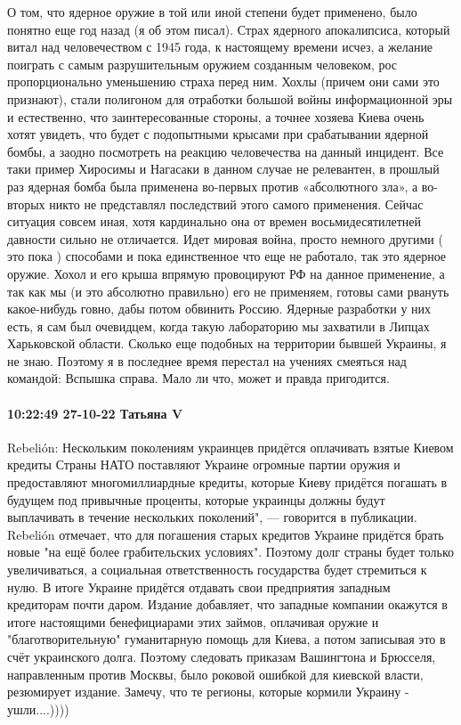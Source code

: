 О том, что ядерное оружие в той или иной степени будет применено, было понятно еще год назад (я об этом писал). Страх ядерного апокалипсиса, который витал над человечеством с 1945 года, к настоящему времени исчез, а желание поиграть с самым разрушительным оружием созданным человеком, рос пропорционально уменьшению страха перед ним.
Хохлы (причем они сами это признают), стали полигоном для отработки большой войны информационной эры и естественно, что заинтересованные стороны, а точнее хозяева Киева очень хотят увидеть, что будет с подопытными крысами при срабатывании ядерной бомбы, а заодно посмотреть на реакцию человечества на данный инцидент.
Все таки пример Хиросимы и Нагасаки в данном случае не релевантен, в прошлый раз ядерная бомба была применена во-первых против «абсолютного зла», а во-вторых никто не представлял последствий этого самого применения. Сейчас ситуация совсем иная, хотя кардинально она от времен восьмидесятилетней давности сильно не отличается.
Идет мировая война, просто немного другими ( это пока ) способами и пока единственное что еще не работало, так это ядерное оружие. Хохол и его крыша впрямую провоцируют РФ на данное применение, а так как мы (и это абсолютно правильно) его не применяем, готовы сами рвануть какое-нибудь говно, дабы потом обвинить Россию.
Ядерные разработки у них есть, я сам был очевидцем, когда такую лабораторию мы захватили в Липцах Харьковской области. Сколько еще подобных на территории бывшей Украины, я не знаю. Поэтому я в последнее время перестал на учениях смеяться над командой: Вспышка справа. Мало ли что, может и правда пригодится.

\paragraph{10:22:49 27-10-22 Татьяна V}

Rebelión: Нескольким поколениям украинцев придётся оплачивать взятые Киевом кредиты
Страны НАТО поставляют Украине огромные партии оружия и предоставляют многомиллиардные кредиты, которые Киеву придётся погашать в будущем под привычные проценты, которые украинцы должны будут выплачивать в течение нескольких поколений", — говорится в публикации.
Rebelión отмечает, что для погашения старых кредитов Украине придётся брать новые "на ещё более грабительских условиях". Поэтому долг страны будет только увеличиваться, а социальная ответственность государства будет стремиться к нулю. В итоге Украине придётся отдавать свои предприятия западным кредиторам почти даром.
Издание добавляет, что западные компании окажутся в итоге настоящими бенефициарами этих займов, оплачивая оружие и "благотворительную" гуманитарную помощь для Киева, а потом записывая это в счёт украинского долга. Поэтому следовать приказам Вашингтона и Брюсселя, направленным против Москвы, было роковой ошибкой для киевской власти, резюмирует издание.
Замечу, что те регионы, которые кормили Украину - ушли....))))


